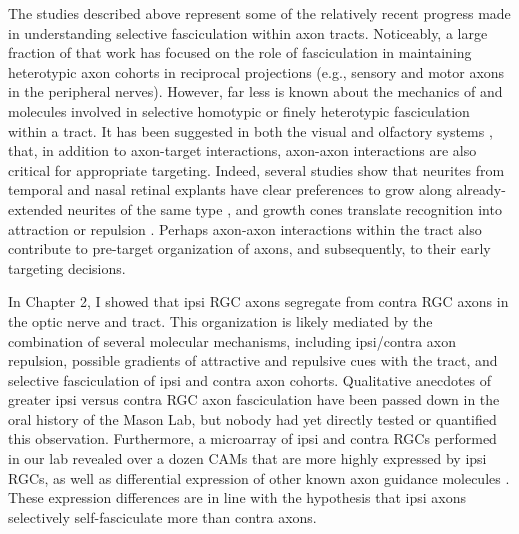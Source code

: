 The studies described above represent some of the relatively recent progress made in understanding selective fasciculation within axon tracts.
Noticeably, a large fraction of that work has focused on the role of fasciculation in maintaining heterotypic axon cohorts in reciprocal projections (e.g., sensory and motor axons in the peripheral nerves).
However, far less is known about the mechanics of and molecules involved in selective homotypic or finely heterotypic fasciculation within a tract.
It has been suggested in both the visual \cite{weth2014chemoaffinity} and olfactory systems \cite{ebrahimi2000olfactory,imai2011axon}, that, in addition to axon-target interactions, axon-axon interactions are also critical for appropriate targeting.
Indeed, several studies \invitro{} show that neurites from temporal and nasal retinal explants have clear preferences to grow along already-extended neurites of the same type \cite{bonhoeffer1985position}, and growth cones translate recognition into attraction or repulsion \cite{raper1990temporal,fan1995localized}. 
Perhaps axon-axon interactions within the tract also contribute to pre-target organization of axons, and subsequently, to their early targeting decisions.

In Chapter 2, I showed that ipsi RGC axons segregate from contra RGC axons in the optic nerve and tract.
This organization is likely mediated by the combination of several molecular mechanisms, including ipsi/contra axon repulsion, possible gradients of attractive and repulsive cues with the tract, and selective fasciculation of ipsi and contra axon cohorts.
Qualitative anecdotes of greater ipsi versus contra RGC axon fasciculation have been passed down in the oral history of the Mason Lab, but nobody had yet directly tested or quantified this observation.
Furthermore, a microarray of ipsi and contra RGCs performed in our lab revealed over a dozen CAMs that are more highly expressed by ipsi RGCs, as well as differential expression of other known axon guidance molecules \cite{wang2016ipsilateral}.
These expression differences are in line with the hypothesis that ipsi axons selectively self-fasciculate more than contra axons.

